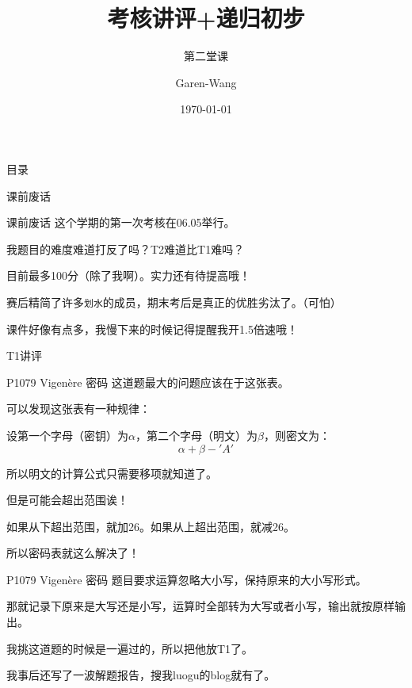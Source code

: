 \documentclass[UTF-8]{beamer}
\begin{document}
\author{Garen-Wang}
\date{\today}
\title{考核讲评+递归初步}
\subtitle{第二堂课}

\titlepage

\begin{frame}{目录}
\tableofcontents
\end{frame}

\begin{section}{课前废话}
\begin{frame}{课前废话}
    \pause
    这个学期的\textcolor[rgb]{0.00,1.00,0.00}{第一次}考核在06.05举行。\pause

    我题目的难度难道打反了吗？T2难道比T1难吗？\pause

    目前最多100分（除了我啊）。实力还有待提高哦！\pause

    赛后精简了许多\texttt{划水}的成员，期末考后是真正的优胜劣汰了。（可怕）\pause

    课件好像有点多，我慢下来的时候记得提醒我开1.5倍速哦！
\end{frame}
\end{section}

\begin{section}{T1讲评}
\begin{frame}{P1079 Vigenère 密码}
    \pause
    这道题最大的问题应该在于这张表。\pause

    可以发现这张表有一种规律：\pause

    设第一个字母（密钥）为$\alpha$，第二个字母（明文）为$\beta$，则密文为：$$\alpha + \beta - 'A'$$ \pause

    所以明文的计算公式只需要移项就知道了。\pause

    但是可能会超出范围诶！\pause

    如果从下超出范围，就加26。如果从上超出范围，就减26。\pause

    所以密码表就这么解决了！
\end{frame}
\begin{frame}{P1079 Vigenère 密码}
    \pause
    题目要求运算忽略大小写，保持原来的大小写形式。\pause

    那就记录下原来是大写还是小写，运算时全部转为大写或者小写，输出就按原样输出。\pause

    我挑这道题的时候是一遍过的，所以把他放T1了。\pause

    我事后还写了一波解题报告，搜我luogu的blog就有了。
\end{frame}
\end{section}
\end{document}
